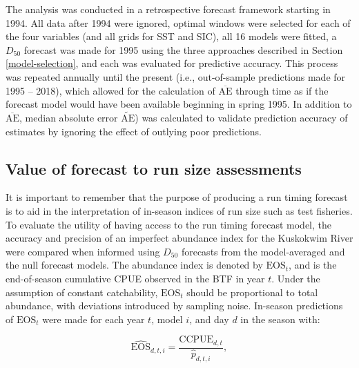 \documentclass[12pt,]{book}
\theoremstyle{definition}
\theoremstyle{definition}
\theoremstyle{definition}
\theoremstyle{remark}
\begin{document}
\noindent
The analysis was conducted in a retrospective forecast framework
starting in 1994. All data after 1994 were ignored, optimal windows were
selected for each of the four variables (and all grids for SST and SIC),
all 16 models were fitted, a \(D_{50}\) forecast was made for 1995 using
the three approaches described in Section \ref{model-selection}, and
each was evaluated for predictive accuracy. This process was repeated
annually until the present (i.e., out-of-sample predictions made for
1995 -- 2018), which allowed for the calculation of
\(\overline{\text{AE}}\) through time as if the forecast model would
have been available beginning in spring 1995. In addition to
\(\overline{\text{AE}}\), median absolute error
\(\widetilde{\text{AE}}\)) was calculated to validate prediction
accuracy of estimates by ignoring the effect of outlying poor
predictions.

\subsection{Value of forecast to run size
assessments}\label{value-of-forecast-to-run-size-assessments}

\noindent
It is important to remember that the purpose of producing a run timing
forecast is to aid in the interpretation of in-season indices of run
size such as test fisheries. To evaluate the utility of having access to
the run timing forecast model, the accuracy and precision of an
imperfect abundance index for the Kuskokwim River were compared when
informed using \(D_{50}\) forecasts from the model-averaged and the null
forecast models. The abundance index is denoted by \(\text{EOS}_t\), and
is the end-of-season cumulative CPUE observed in the BTF in year \(t\).
Under the assumption of constant catchability, \(\text{EOS}_t\) should
be proportional to total abundance, with deviations introduced by
sampling noise. In-season predictions of \(\text{EOS}_t\) were made for
each year \(t\), model \(i\), and day \(d\) in the season with:

\begin{equation}
  \widehat{\text{EOS}}_{d,t,i}=\frac{\text{CCPUE}_{d,t}}{\hat{p}_{d,t,i}},
\label{eq:eos}
\end{equation}
\end{document}
